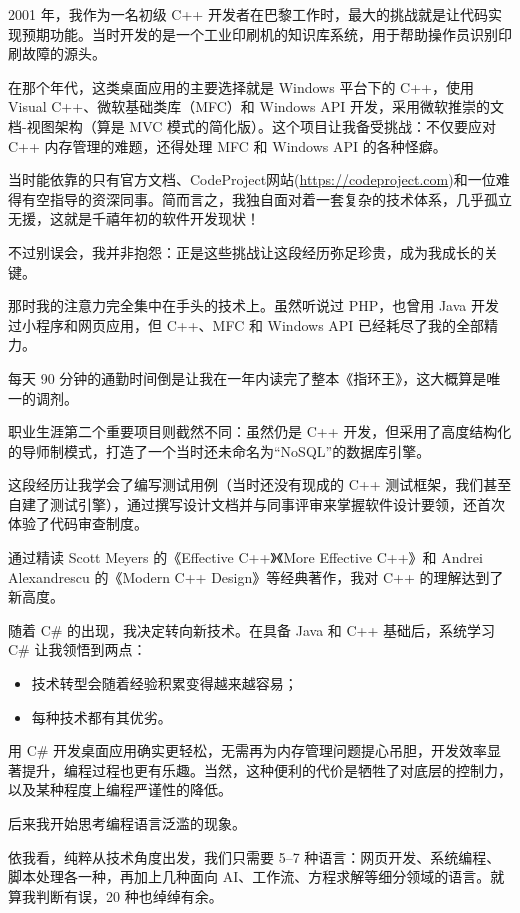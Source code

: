 2001 年，我作为一名初级 C++ 开发者在巴黎工作时，最大的挑战就是让代码实现预期功能。当时开发的是一个工业印刷机的知识库系统，用于帮助操作员识别印刷故障的源头。

在那个年代，这类桌面应用的主要选择就是 Windows 平台下的 C++，使用 Visual C++、微软基础类库（MFC）和 Windows API 开发，采用微软推崇的文档-视图架构（算是 MVC 模式的简化版）。这个项目让我备受挑战：不仅要应对 C++ 内存管理的难题，还得处理 MFC 和 Windows API 的各种怪癖。

当时能依靠的只有官方文档、CodeProject网站(\url{https://codeproject.com})和一位难得有空指导的资深同事。简而言之，我独自面对着一套复杂的技术体系，几乎孤立无援，这就是千禧年初的软件开发现状！

不过别误会，我并非抱怨：正是这些挑战让这段经历弥足珍贵，成为我成长的关键。

那时我的注意力完全集中在手头的技术上。虽然听说过 PHP，也曾用 Java 开发过小程序和网页应用，但 C++、MFC 和 Windows API 已经耗尽了我的全部精力。

每天 90 分钟的通勤时间倒是让我在一年内读完了整本《指环王》，这大概算是唯一的调剂。

职业生涯第二个重要项目则截然不同：虽然仍是 C++ 开发，但采用了高度结构化的导师制模式，打造了一个当时还未命名为“NoSQL”的数据库引擎。

这段经历让我学会了编写测试用例（当时还没有现成的 C++ 测试框架，我们甚至自建了测试引擎），通过撰写设计文档并与同事评审来掌握软件设计要领，还首次体验了代码审查制度。

通过精读 Scott Meyers 的《Effective C++》《More Effective C++》和 Andrei Alexandrescu 的《Modern C++ Design》等经典著作，我对 C++ 的理解达到了新高度。

随着 C\# 的出现，我决定转向新技术。在具备 Java 和 C++ 基础后，系统学习 C\# 让我领悟到两点：

\begin{itemize}
\item 
技术转型会随着经验积累变得越来越容易；

\item 
每种技术都有其优劣。
\end{itemize}

用 C\# 开发桌面应用确实更轻松，无需再为内存管理问题提心吊胆，开发效率显著提升，编程过程也更有乐趣。当然，这种便利的代价是牺牲了对底层的控制力，以及某种程度上编程严谨性的降低。

后来我开始思考编程语言泛滥的现象。

依我看，纯粹从技术角度出发，我们只需要 5–7 种语言：网页开发、系统编程、脚本处理各一种，再加上几种面向 AI、工作流、方程求解等细分领域的语言。就算我判断有误，20 种也绰绰有余。

